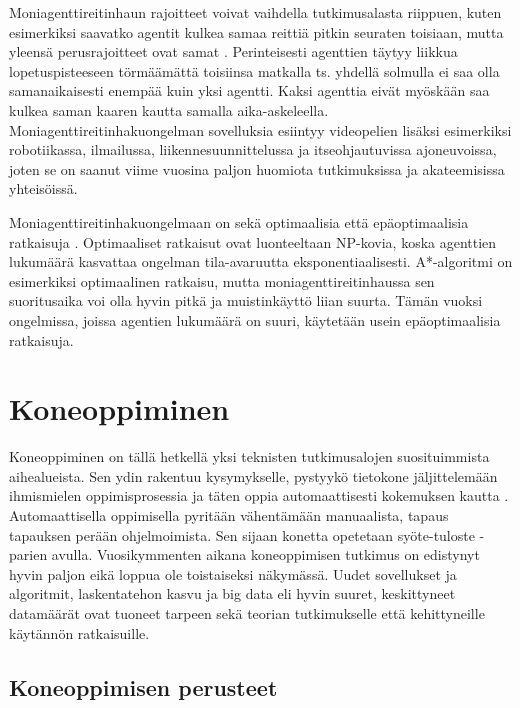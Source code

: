 \documentclass[utf8]{gradu3}
\begin{document}
Moniagenttireitinhaun rajoitteet voivat vaihdella tutkimusalasta riippuen, kuten esimerkiksi saavatko agentit kulkea samaa reittiä pitkin seuraten toisiaan, mutta yleensä perusrajoitteet ovat samat \parencite{sharon2015conflict,stern2019multi}. Perinteisesti agenttien täytyy liikkua lopetuspisteeseen törmäämättä toisiinsa matkalla ts. yhdellä solmulla ei saa olla samanaikaisesti enempää kuin yksi agentti. Kaksi agenttia eivät myöskään saa kulkea saman kaaren kautta samalla aika-askeleella. Moniagenttireitinhakuongelman sovelluksia esiintyy videopelien lisäksi esimerkiksi robotiikassa, ilmailussa, liikennesuunnittelussa ja itseohjautuvissa ajoneuvoissa, joten se on saanut viime vuosina paljon huomiota tutkimuksissa ja akateemisissa yhteisöissä.

Moniagenttireitinhakuongelmaan on sekä optimaalisia että epäoptimaalisia ratkaisuja \parencite{sharon2015conflict}. Optimaaliset ratkaisut ovat luonteeltaan NP-kovia, koska agenttien lukumäärä kasvattaa ongelman tila-avaruutta eksponentiaalisesti. A*-algoritmi on esimerkiksi optimaalinen ratkaisu, mutta moniagenttireitinhaussa sen suoritusaika voi olla hyvin pitkä ja muistinkäyttö liian suurta. Tämän vuoksi ongelmissa, joissa agentien lukumäärä on suuri, käytetään usein epäoptimaalisia ratkaisuja.

\chapter{Koneoppiminen}
\label{koneoppiminen}

Koneoppiminen on tällä hetkellä yksi teknisten tutkimusalojen suosituimmista aihealueista. Sen ydin rakentuu kysymykselle, pystyykö tietokone jäljittelemään ihmismielen oppimisprosessia ja täten oppia automaattisesti kokemuksen kautta \parencite{das2017survey,jordan2015machine}. Automaattisella oppimisella pyritään vähentämään manuaalista, tapaus tapauksen perään ohjelmoimista. Sen sijaan konetta opetetaan syöte-tuloste -parien avulla. Vuosikymmenten aikana koneoppimisen tutkimus on edistynyt hyvin paljon eikä loppua ole toistaiseksi näkymässä. Uudet sovellukset ja algoritmit, laskentatehon kasvu ja big data eli hyvin suuret, keskittyneet datamäärät ovat tuoneet tarpeen sekä teorian tutkimukselle että kehittyneille käytännön ratkaisuille.

\section{Koneoppimisen perusteet}
\end{document}
